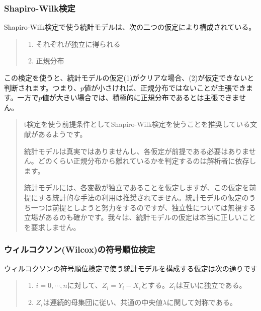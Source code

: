 \documentclass[a4paper,11pt,dvipdfmx]{jsarticle}
\begin{document}
\subsubsection{Shapiro-Wilk検定}
Shapiro-Wilk検定で使う統計モデルは、次の二つの仮定により構成されている。
\begin{quote}
    \begin{enumerate}[(1)]
\item それぞれが独立に得られる
\item 正規分布
\end{enumerate}
\end{quote}
この検定を使うと、統計モデルの仮定(1)がクリアな場合、(2)が仮定できないと判断されます。つまり、$p$値が小さければ、正規分布ではないことが主張できます。一方で$p$値が大きい場合では、積極的に正規分布であるとは主張できません。

\begin{mybox}
    \begin{quotation}
t検定を使う前提条件としてShapiro-Wilk検定を使うことを推奨している文献があるようです。


統計モデルは真実ではありませんし、各仮定が前提である必要はありません。どのくらい正規分布から離れているかを判定するのは解析者に依存します。

統計モデルには、各変数が独立であることを仮定しますが、この仮定を前提にする統計的な手法の利用は推奨されてません。統計モデルの仮定のうち一つは前提としようと努力をするのですが、独立性については無視する立場があるのも確かです。我々は、統計モデルの仮定は本当に正しいことを要求しません。
\end{quotation}
\end{mybox}






\subsubsection{ウィルコクソン(Wilcox)の符号順位検定}
ウィルコクソンの符号順位検定で使う統計モデルを構成する仮定は次の通りです
\begin{quote}
    \begin{enumerate}[(1)]
\item $i=0,\cdots,n$に対して、$Z_i=Y_i-X_i$とする。$Z_i$は互いに独立である。
\item $Z_i$は連続的母集団に従い、共通の中央値$\lambda$に関して対称である。
\end{enumerate}
\end{quote}  
\end{document}
